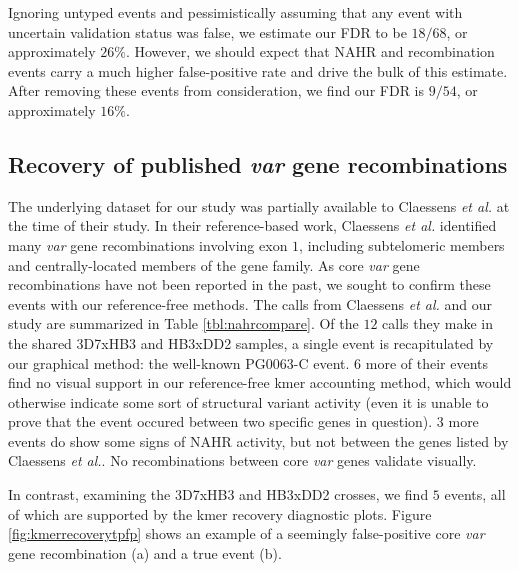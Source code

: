 Ignoring untyped events and pessimistically assuming that any event with uncertain validation status was false, we estimate our FDR to be $18/68$, or approximately $26\%$.  However, we should expect that NAHR and recombination events carry a much higher false-positive rate and drive the bulk of this estimate.  After removing these events from consideration, we find our FDR is $9/54$, or approximately $16\%$.

\subsection{Recovery of published \textit{var} gene recombinations}

The underlying dataset for our study was partially available to Claessens \textit{et al.} at the time of their study.  In their reference-based work, Claessens \textit{et al.} identified many \textit{var} gene recombinations involving exon $1$, including subtelomeric members and centrally-located members of the gene family.  As core \textit{var} gene recombinations have not been reported in the past, we sought to confirm these events with our reference-free methods.  The calls from Claessens \textit{et al.} and our study are summarized in Table \ref{tbl:nahrcompare}.  Of the $12$ calls they make in the shared 3D7xHB3 and HB3xDD2 samples, a single event is recapitulated by our graphical method: the well-known PG0063-C event.  $6$ more of their events find no visual support in our reference-free kmer accounting method, which would otherwise indicate some sort of structural variant activity (even it is unable to prove that the event occured between two specific genes in question).  $3$ more events do show some signs of NAHR activity, but not between the genes listed by Claessens \textit{et al.}.  No recombinations between core \textit{var} genes validate visually.

In contrast, examining the 3D7xHB3 and HB3xDD2 crosses, we find $5$ events, all of which are supported by the kmer recovery diagnostic plots.  Figure \ref{fig:kmerrecoverytpfp} shows an example of a seemingly false-positive core \textit{var} gene recombination (a) and a true event (b).

